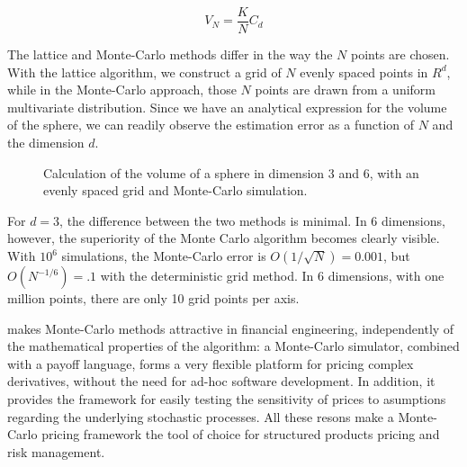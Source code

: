 \documentclass[12pt,]{tufte-book}
\begin{document}
\[
V_N = \frac{K}{N} C_d
\]

The lattice and Monte-Carlo methods differ in the way the \(N\) points are chosen.
With the lattice algorithm, we construct a grid of \(N\) evenly spaced points in \(R^d\), while in the Monte-Carlo approach, those \(N\) points are drawn from a uniform multivariate distribution. Since we have an analytical expression for the volume of the sphere, we can readily observe the estimation error as a function of \(N\) and the dimension \(d\).

\begin{figure}
\caption[Calculation of the volume of a sphere in dimension 3 and 6, with an evenly spaced grid and Monte-Carlo simulation]{Calculation of the volume of a sphere in dimension 3 and 6, with an evenly spaced grid and Monte-Carlo simulation.}\label{fig:dim-3-6}
\end{figure}

For \(d=3\), the difference between the two methods is minimal.
In 6 dimensions, however, the superiority of the Monte Carlo algorithm becomes clearly visible. With \(10^6\) simulations, the Monte-Carlo error is \(O(1/\sqrt{N}) = 0.001\), but \(O(N^{-1/6}) = .1\) with the deterministic grid method. In 6 dimensions, with one million points, there are only 10 grid points per axis.

 makes Monte-Carlo methods attractive in financial engineering, independently of the mathematical properties of the algorithm: a Monte-Carlo simulator, combined with a payoff language, forms a very flexible platform for pricing complex derivatives, without the need for ad-hoc software development. In addition, it provides the framework for easily testing the sensitivity of prices to asumptions regarding the underlying stochastic processes. All these resons make a Monte-Carlo pricing framework the tool of choice for structured products pricing and risk management.
\end{document}
